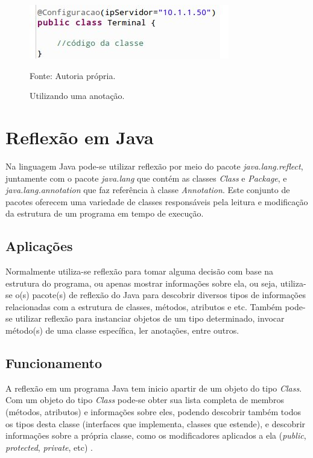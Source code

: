 \documentclass[tc,openright]{iiufrgs}
\begin{document}
\begin{figure}[ht]
	\centering
	\includegraphics[scale=0.6]{figuras/usandoAnnotation.jpg}
	\caption{Utilizando uma anotação.}
	\small{Fonte: Autoria própria.}
	\label{fig:usandoAnotacao}
\end{figure}

\section{Reflexão em Java}
Na linguagem Java pode-se utilizar reflexão por meio do pacote \textit{java.lang.reflect}, juntamente com o pacote \textit{java.lang} que contém as classes \textit{Class} e \textit{Package}, e \textit{java.lang.annotation} que faz referência à classe \textit{Annotation}. Este conjunto de pacotes oferecem uma variedade de classes responsáveis pela leitura e modificação da estrutura de um programa em tempo de execução.


\subsection{Aplicações}

Normalmente utiliza-se reflexão para tomar alguma decisão com base na estrutura do programa, ou apenas mostrar informações sobre ela, ou seja,  utiliza-se o(s) pacote(s) de reflexão do Java para descobrir diversos tipos de informações relacionadas com a estrutura de classes, métodos, atributos e etc. Também pode-se utilizar reflexão para instanciar objetos de um tipo determinado, invocar método(s) de uma classe específica, ler anotações, entre outros.

\subsection{Funcionamento}
A reflexão em um programa Java tem inicio apartir de um objeto do tipo \textit{Class}. Com um objeto do tipo \textit{Class} pode-se obter sua lista completa de membros (métodos, atributos) e informações sobre eles, podendo descobrir também todos os tipos desta classe (interfaces que implementa, classes que estende), e descobrir informações sobre a própria classe, como os modificadores aplicados a ela (\textit{public}, \textit{protected}, \textit{private}, etc) \cite{arnold2000java}.
\end{document}
